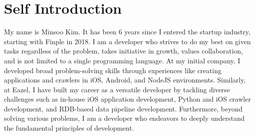\section{Self Introduction} %
    \begin{itemize}[leftmargin=0.15in, label={}]
    \small{\item{My name is Minsoo Kim. It has been 6 years since I entered the startup industry, starting with Finple in 2018. I am a developer who strives to do my best on given tasks regardless of the problem, takes initiative in growth, values collaboration, and is not limited to a single programming language. At my initial company, I developed broad problem-solving skills through experiences like creating applications and crawlers in iOS, Android, and NodeJS environments. Similarly, at Eazel, I have built my career as a versatile developer by tackling diverse challenges such as in-house iOS application development, Python and iOS crawler development, and RDB-based data pipeline development. Furthermore, beyond solving various problems, I am a developer who endeavors to deeply understand the fundamental principles of development.}} %
    \end{itemize}